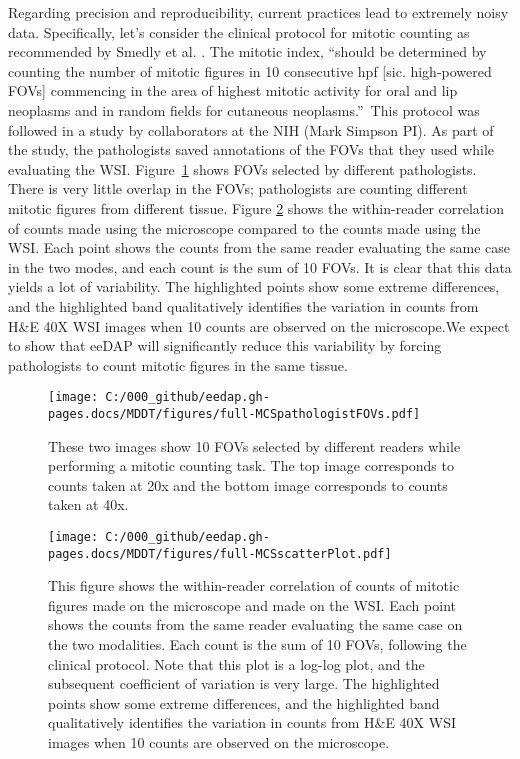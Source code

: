 \documentclass{article}%
\begin{document}
Regarding precision and reproducibility, current practices lead to extremely
noisy data. Specifically, let's consider the clinical protocol for mitotic
counting as recommended by Smedly et al. \cite{Smedley2011_Vet-Pathol_v48p32}.
The mitotic index, \textquotedblleft should be determined by counting the
number of mitotic figures in 10 consecutive hpf {[}sic. high-powered FOVs{]}
commencing in the area of highest mitotic activity for oral and lip neoplasms
and in random fields for cutaneous neoplasms.\textquotedblright\ This protocol
was followed in a study by collaborators at the NIH (Mark Simpson PI). As part
of the study, the pathologists saved annotations of the FOVs that they used
while evaluating the WSI. Figure~\ref{fig_full-MCSpathologistFOVs} shows FOVs
selected by different pathologists. There is very little overlap in the FOVs;
pathologists are counting different mitotic figures from different tissue.
Figure \ref{fig_full-MCSscatterPlot} shows the within-reader correlation of
counts made using the microscope compared to the counts made using the WSI.
Each point shows the counts from the same reader evaluating the same case in
the two modes, and each count is the sum of 10 FOVs. It is clear that this
data yields a lot of variability. The highlighted points show some extreme
differences, and the highlighted band qualitatively identifies the variation
in counts from H\&E 40X WSI images when 10 counts are observed on the
microscope.We expect to show that eeDAP will significantly reduce this
variability by forcing pathologists to count mitotic figures in the same tissue.

\begin{figure}[ptbh]
\label{fig_full-MCSpathologistFOVs}
\texttt{[image: C:/000\_github/eedap.gh-pages.docs/MDDT/figures/full-MCSpathologistFOVs.pdf]}\caption{These
two images show 10 FOVs selected by different readers while performing a
mitotic counting task. The top image corresponds to counts taken at 20x and
the bottom image corresponds to counts taken at 40x.}%
\end{figure}

\begin{figure}[ptbh]
\label{fig_full-MCSscatterPlot}
\texttt{[image: C:/000\_github/eedap.gh-pages.docs/MDDT/figures/full-MCSscatterPlot.pdf]}\caption{This
figure shows the within-reader correlation of counts of mitotic figures made
on the microscope and made on the WSI. Each point shows the counts from the
same reader evaluating the same case on the two modalities. Each count is the
sum of 10 FOVs, following the clinical protocol. Note that this plot is a
log-log plot, and the subsequent coefficient of variation is very large. The
highlighted points show some extreme differences, and the highlighted band
qualitatively identifies the variation in counts from H\&E 40X WSI images when
10 counts are observed on the microscope.}%
\end{figure}
\end{document}
